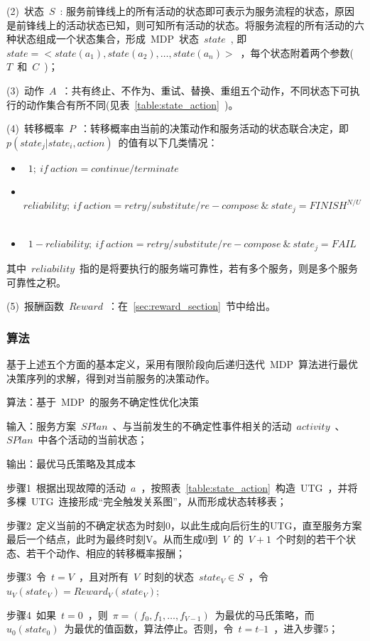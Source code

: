 (2)~状态~$S$~: 服务前锋线上的所有活动的状态即可表示为服务流程的状态，原因是前锋线上的活动状态已知，则可知所有活动的状态。将服务流程的所有活动的六种状态组成一个状态集合，形成~MDP~状态~$state$~, 即~$state =  < state({a_1}),state({a_2}), \ldots ,state({a_n}) >$~，每个状态附着两个参数(~$T$~和~$C$~)；

(3)~动作~$A$~：共有终止、不作为、重试、替换、重组五个动作，不同状态下可执行的动作集合有所不同(见表~\ref{table:state_action}~)。

(4)~转移概率~$P$~：转移概率由当前的决策动作和服务活动的状态联合决定，即~$p(state_j|state_i,action)$~的值有以下几类情况：
\begin{itemize}
\item ~$1;~if~action = continue/terminate$~
\item ~$reliability;~if~action = retry/substitute/re-compose~ \& ~ state_j = FINIS{H^{N/U}}$~
\item ~$1 - reliability;~if~action = retry/substitute/re-compose ~\& ~ state_j = FAIL$~
\end{itemize}
其中~$reliability$~指的是将要执行的服务端可靠性，若有多个服务，则是多个服务可靠性之积。

(5)~报酬函数~$Reward$~：在~\ref{sec:reward_section}~节中给出。

\subsubsection{算法}

基于上述五个方面的基本定义，采用有限阶段向后递归迭代~MDP~算法进行最优决策序列的求解，得到对当前服务的决策动作。

算法：基于~MDP~的服务不确定性优化决策

输入：服务方案~$SPlan$~、与当前发生的不确定性事件相关的活动~$activity$~、
~$SPlan$~中各个活动的当前状态；

输出：最优马氏策略及其成本

步骤1~根据出现故障的活动~$a$~，按照表~\ref{table:state_action}~构造~UTG~，并将多棵~UTG~连接形成“完全触发关系图”，从而形成状态转移表；

步骤2~定义当前的不确定状态为时刻0，以此生成向后衍生的UTG，直至服务方案最后一个结点，此时为最终时刻V。从而生成0到~$V$~的~$V+1$~个时刻的若干个状态、若干个动作、相应的转移概率报酬；

步骤3~令~$t=V$~，且对所有~$V$~时刻的状态~$state_V \in S$~，令~${u_V}( {state_V} ) = Reward_V( {state_V} )$;

步骤4~如果~$t=0$~，则~$\pi  = (f_0,f_1,\ldots ,f_{V-1})$~为最优的马氏策略，而~${u_0}( state_0)$~为最优的值函数，算法停止。否则，令~$t=t–1$~，进入步骤5；

